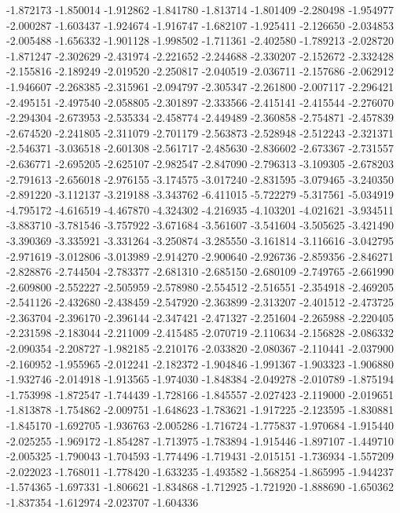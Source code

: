 -1.872173
-1.850014
-1.912862
-1.841780
-1.813714
-1.801409
-2.280498
-1.954977
-2.000287
-1.603437
-1.924674
-1.916747
-1.682107
-1.925411
-2.126650
-2.034853
-2.005488
-1.656332
-1.901128
-1.998502
-1.711361
-2.402580
-1.789213
-2.028720
-1.871247
-2.302629
-2.431974
-2.221652
-2.244688
-2.330207
-2.152672
-2.332428
-2.155816
-2.189249
-2.019520
-2.250817
-2.040519
-2.036711
-2.157686
-2.062912
-1.946607
-2.268385
-2.315961
-2.094797
-2.305347
-2.261800
-2.007117
-2.296421
-2.495151
-2.497540
-2.058805
-2.301897
-2.333566
-2.415141
-2.415544
-2.276070
-2.294304
-2.673953
-2.535334
-2.458774
-2.449489
-2.360858
-2.754871
-2.457839
-2.674520
-2.241805
-2.311079
-2.701179
-2.563873
-2.528948
-2.512243
-2.321371
-2.546371
-3.036518
-2.601308
-2.561717
-2.485630
-2.836602
-2.673367
-2.731557
-2.636771
-2.695205
-2.625107
-2.982547
-2.847090
-2.796313
-3.109305
-2.678203
-2.791613
-2.656018
-2.976155
-3.174575
-3.017240
-2.831595
-3.079465
-3.240350
-2.891220
-3.112137
-3.219188
-3.343762
-6.411015
-5.722279
-5.317561
-5.034919
-4.795172
-4.616519
-4.467870
-4.324302
-4.216935
-4.103201
-4.021621
-3.934511
-3.883710
-3.781546
-3.757922
-3.671684
-3.561607
-3.541604
-3.505625
-3.421490
-3.390369
-3.335921
-3.331264
-3.250874
-3.285550
-3.161814
-3.116616
-3.042795
-2.971619
-3.012806
-3.013989
-2.914270
-2.900640
-2.926736
-2.859356
-2.846271
-2.828876
-2.744504
-2.783377
-2.681310
-2.685150
-2.680109
-2.749765
-2.661990
-2.609800
-2.552227
-2.505959
-2.578980
-2.554512
-2.516551
-2.354918
-2.469205
-2.541126
-2.432680
-2.438459
-2.547920
-2.363899
-2.313207
-2.401512
-2.473725
-2.363704
-2.396170
-2.396144
-2.347421
-2.471327
-2.251604
-2.265988
-2.220405
-2.231598
-2.183044
-2.211009
-2.415485
-2.070719
-2.110634
-2.156828
-2.086332
-2.090354
-2.208727
-1.982185
-2.210176
-2.033820
-2.080367
-2.110441
-2.037900
-2.160952
-1.955965
-2.012241
-2.182372
-1.904846
-1.991367
-1.903323
-1.906880
-1.932746
-2.014918
-1.913565
-1.974030
-1.848384
-2.049278
-2.010789
-1.875194
-1.753998
-1.872547
-1.744439
-1.728166
-1.845557
-2.027423
-2.119000
-2.019651
-1.813878
-1.754862
-2.009751
-1.648623
-1.783621
-1.917225
-2.123595
-1.830881
-1.845170
-1.692705
-1.936763
-2.005286
-1.716724
-1.775837
-1.970684
-1.915440
-2.025255
-1.969172
-1.854287
-1.713975
-1.783894
-1.915446
-1.897107
-1.449710
-2.005325
-1.790043
-1.704593
-1.774496
-1.719431
-2.015151
-1.736934
-1.557209
-2.022023
-1.768011
-1.778420
-1.633235
-1.493582
-1.568254
-1.865995
-1.944237
-1.574365
-1.697331
-1.806621
-1.834868
-1.712925
-1.721920
-1.888690
-1.650362
-1.837354
-1.612974
-2.023707
-1.604336
